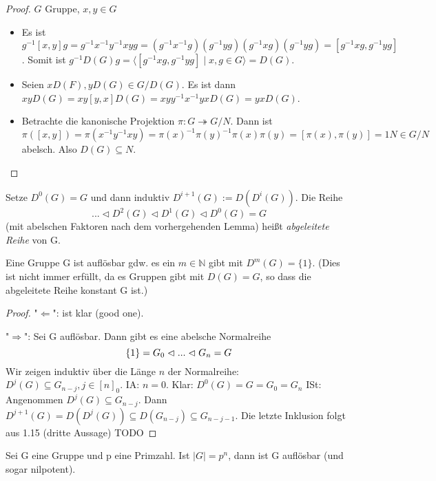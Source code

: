 \documentclass[../main.tex]{subfiles}
\begin{document}
\begin{proof}
$G$ Gruppe, $x, y \in G$
\begin{itemize}
    \item Es ist $g^{-1}[x,y]g = g^{-1}x^{-1}y^{-1}xyg = (g^{-1}x^{-1}g)(g^{-1}yg)(g^{-1}xg)(g^{-1}yg) = [g^{-1}xg, g^{-1}yg]$. Somit ist $g^{-1}D(G)g = \langle[g^{-1}xg, g^{-1}yg] \mid x,g \in G\rangle = D(G)$.
    
    \item Seien $xD(F), yD(G) \in G/D(G)$. Es ist dann $xyD(G) = xy[y,x]D(G) = xyy^{-1}x^{-1}yxD(G) = yxD(G)$. 
    
    \item Betrachte die kanonische Projektion $\pi: G \twoheadrightarrow G/N$. Dann ist $\pi([x,y]) = \pi(x^{-1}y^{-1}xy) = \pi(x)^{-1}\pi(y)^{-1}\pi(x)\pi(y) = [\pi(x), \pi(y)] = 1N \in G/N$ abelsch.
    Also $D(G) \subseteq N$.
\end{itemize}
\end{proof}
\begin{definition}
    Setze $D^0(G) = G$ und dann induktiv $D^{i+1}(G) := D(D^i(G))$. Die Reihe 
    $$... \triangleleft D^2(G) \triangleleft D^1(G) \triangleleft D^0(G) = G$$
    (mit abelschen Faktoren nach dem vorhergehenden Lemma) heißt \emph{abgeleitete Reihe} von G.
\end{definition}
\begin{theorem}
    Eine Gruppe G ist auflösbar gdw. es ein $m \in \mathbb{N}$ gibt mit $D^m(G) = \{1\}$. (Dies ist nicht immer erfüllt, da es Gruppen gibt mit $D(G) = G$, so dass die abgeleitete Reihe konstant G ist.)
\end{theorem}
\begin{proof}
    "$\Leftarrow$": ist klar (good one).

    "$\Rightarrow$": Sei G auflösbar. Dann gibt es eine abelsche Normalreihe
    $$\{1\} = G_0 \vartriangleleft ... \vartriangleleft G_n = G$$
    Wir zeigen induktiv über die Länge $n$ der Normalreihe: $D^j(G) \subseteq G_{n-j}, j \in [n]_0$.
    IA: $n=0$. Klar: $D^0(G) = G = G_0 = G_n$
    ISt: Angenommen $D^j(G) \subseteq G_{n-j}$. Dann $D^{j+1}(G) = D(D^j(G)) \subseteq D(G_{n-j}) \subseteq G_{n-j-1}$. Die letzte Inklusion folgt aus 1.15 (dritte Aussage) TODO
\end{proof}
\begin{example}
    Sei G eine Gruppe und p eine Primzahl. Ist $|G| = p^n$, dann ist G auflösbar (und sogar nilpotent).
\end{example}
\end{document}
